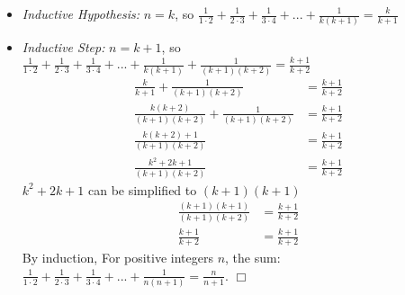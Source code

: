 \documentclass{article}
\begin{document}
\begin{itemize}
\begin{itemize}
        \item[]\emph{Inductive Hypothesis:} $n=k$, so $\frac{1}{1\cdot2}+\frac{1}{2\cdot3}+\frac{1}{3\cdot4}+...+\frac{1}{k(k+1)}=\frac{k}{k+1}$
        
        \item[]\emph{Inductive Step:} $n=k+1$, so $\frac{1}{1\cdot2}+\frac{1}{2\cdot3}+\frac{1}{3\cdot4}+...+\frac{1}{k(k+1)}+\frac{1}{(k+1)(k+2)}=\frac{k+1}{k+2}$
        \begin{align}
            \frac{k}{k+1}+\frac{1}{(k+1)(k+2)}&=\frac{k+1}{k+2}\nonumber\\
            \frac{k(k+2)}{(k+1)(k+2)}+\frac{1}{(k+1)(k+2)}&=\frac{k+1}{k+2}\nonumber\\
            \frac{k(k+2)+1}{(k+1)(k+2)}&=\frac{k+1}{k+2}\nonumber\\
            \frac{k^2+2k+1}{(k+1)(k+2)}&=\frac{k+1}{k+2}\nonumber
        \end{align}
        $k^2+2k+1$ can be simplified to $(k+1)(k+1)$
        \begin{align}
            \frac{(k+1)(k+1)}{(k+1)(k+2)}&=\frac{k+1}{k+2}\nonumber\\
            \frac{k+1}{k+2}&=\frac{k+1}{k+2}\nonumber
        \end{align}
        By induction, For positive integers $n$, the sum: $\frac{1}{1\cdot2}+\frac{1}{2\cdot3}+\frac{1}{3\cdot4}+...+\frac{1}{n(n+1)}=\frac{n}{n+1}$. $\Box$
    \end{itemize}
\end{itemize}
\end{document}
